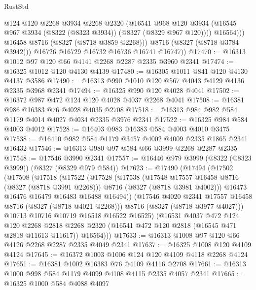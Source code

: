 \begin{lexlean}{RustStd}
\begin{coremodule}
                  @124
                  @120
                  @2268
                  @3934
                  @2268
                  @2320
                  (@16541
                    @968
                    @120
                    @3934
                    (@16545 @967 @3934 (@8322 (@8323 @3934)) (@8327 (@8329 @967 @120))))
                  @16564)))
            @16458
            @8716
            (@8327 (@8718 @3859 @2268)))
          @8716
          (@8327 (@8718 @3784 @3942)))
        @16726
        @16729
        @16732
        @16736
        @16741
        @16747))
@17470 := @16313 @1012 @97 @120 @66 @4141 @2268 @2287 @2335 @3960 @2341
@17474 := @16325 @1012 @120 @4130 @4139
@17480 := @16305 @1011 @841 @120 @4130 @4137 @3586
@17490 := @16313 @990 @1010 @120 @567 @4043 @4129 @4136 @2335 @3968 @2341
@17494 := @16325 @990 @120 @4028 @4041
@17502 := @16372 @987 @472 @124 @120 @4028 @4037 @2268 @4041
@17508 := @16381 @986 @16383 @76 @4028 @4035 @2708
@17518 := @16313 @984 @982 @584 @1179 @4014 @4027 @4034 @2335 @3976 @2341
@17522 := @16325 @984 @584 @4003 @4012
@17528 := @16403 @983 @16383 @584 @4003 @4010 @3475
@17538 := @16410 @982 @584 @1179 @3457 @4002 @4009 @2335 @1865 @2341 @16432
@17546 := @16313 @980 @97 @584 @66 @3999 @2268 @2287 @2335
@17548 := @17546 @3990 @2341
@17557 := @16446 @979 @3999 (@8322 (@8323 @3999)) (@8327 (@8329 @979 @584))
@17623 := @17490
    (@17494
      (@17502
        (@17508
          (@17518
            (@17522
              (@17528
                (@17538
                  (@17548 @17557 @16458 @8716 (@8327 (@8718 @3991 @2268)))
                  @8716
                  (@8327 (@8718 @3981 @4002)))
                @16473
                @16476
                @16479
                @16483
                @16488
                @16494))
            (@17546 @4020 @2341 @17557 @16458 @8716 (@8327 (@8718 @4021 @2268)))
            @8716
            (@8327 (@8718 @3977 @4027)))
          @10713
          @10716
          @10719
          @16518
          @16522
          @16525)
        (@16531
          @4037
          @472
          @124
          @120
          @2268
          @2818
          @2268
          @2320
          (@16541 @472 @120 @2818 (@16545 @471 @2818 @11613 @11617))
          @16564)))
@17633 := @16313 @1008 @97 @120 @66 @4126 @2268 @2287 @2335 @4049 @2341
@17637 := @16325 @1008 @120 @4109 @4124
@17645 := @16372 @1003 @1006 @124 @120 @4109 @4118 @2268 @4124
@17651 := @16381 @1002 @16383 @76 @4109 @4116 @2708
@17661 := @16313 @1000 @998 @584 @1179 @4099 @4108 @4115 @2335 @4057 @2341
@17665 := @16325 @1000 @584 @4088 @4097

\end{coremodule}
\end{lexlean}
